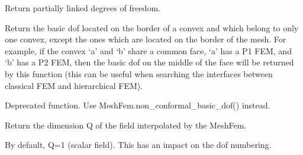 \documentclass[a4paper,11pt,english]{sphinxmanual}
\begin{document}
\begin{fulllineitems}
\begin{fulllineitems}
\end{fulllineitems}


\begin{fulllineitems}
\label{\detokenize{python/cmdref_MeshFem:getfem.MeshFem.non_conformal_basic_dof}}
Return partially linked degrees of freedom.

Return the basic dof located on the border of a convex and which belong
to only one convex, except the ones which are located on the border
of the mesh.  For example, if the convex ‘a’ and ‘b’ share a common
face, ‘a’ has a P1 FEM, and ‘b’ has a P2 FEM, then the basic dof on the
middle of the face will be returned by this function (this can be
useful when searching the interfaces between classical FEM and
hierarchical FEM).

\end{fulllineitems}


\begin{fulllineitems}
\label{\detokenize{python/cmdref_MeshFem:getfem.MeshFem.non_conformal_dof}}
Deprecated function. Use MeshFem.non\_conformal\_basic\_dof() instead.

\end{fulllineitems}


\begin{fulllineitems}
\label{\detokenize{python/cmdref_MeshFem:getfem.MeshFem.qdim}}
Return the dimension Q of the field interpolated by the MeshFem.

By default, Q=1 (scalar field). This has an impact on the dof numbering.

\end{fulllineitems}



\end{fulllineitems}
\end{document}
